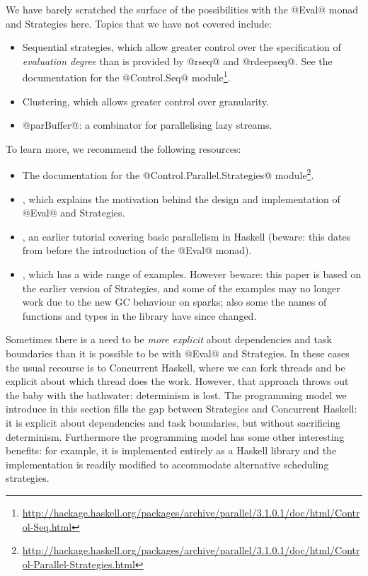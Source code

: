 
We have barely scratched the surface of the possibilities with the
@Eval@ monad and Strategies here.  Topics that we have not covered
include:

\begin{itemize}
\item Sequential strategies, which allow greater control over the
  specification of \emph{evaluation degree} than is provided by @rseq@
  and @rdeepseq@.  See the documentation for the @Control.Seq@ module\footnote{\url{http://hackage.haskell.org/packages/archive/parallel/3.1.0.1/doc/html/Control-Seq.html}}.
\item Clustering, which allows greater control over granularity.
\item @parBuffer@: a combinator for parallelising lazy streams.
\end{itemize}

To learn more, we recommend the following resources:

\begin{itemize}
\item The documentation for the @Control.Parallel.Strategies@ module\footnote{\url{http://hackage.haskell.org/packages/archive/parallel/3.1.0.1/doc/html/Control-Parallel-Strategies.html}}.
\item \citet{seq-no-more}, which explains the motivation behind the
  design and implementation of @Eval@ and Strategies.
\item \citet{pjsingh-tutorial}, an earlier tutorial covering
  basic parallelism in Haskell (beware: this dates from before the
  introduction of the @Eval@ monad).
\item \citet{trinder:strategies}, which has a wide range of examples.
  However beware: this paper is based on the earlier version of
  Strategies, and some of the examples may no longer work due to the
  new GC behaviour on sparks; also some the names of functions and
  types in the library have since changed.
\end{itemize}


Sometimes there is a need to be \emph{more explicit} about
dependencies and task boundaries than it is possible to be with @Eval@
and Strategies.  In these cases the usual recourse is to Concurrent
Haskell, where we can fork threads and be explicit about which thread
does the work.  However, that approach throws out the baby with the
bathwater: determinism is lost.  The programming model we introduce in
this section fills the gap between Strategies and Concurrent Haskell:
it is explicit about dependencies and task boundaries, but without
sacrificing determinism.  Furthermore the programming model has some
other interesting benefits: for example, it is implemented entirely as
a Haskell library and the implementation is readily modified to
accommodate alternative scheduling strategies.

